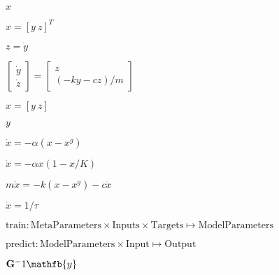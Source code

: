 \documentclass{article}
\begin{document}
$ x $
\pagebreak

$ x = [y~z]^T$
\pagebreak

$ z = \dot{y}$
\pagebreak

$ \left[ \begin{array}{l} \dot{y} \\ \dot{z} \end{array} \right] = \left[ \begin{array}{l} z \\ (-ky -cz)/m \end{array} \right] $
\pagebreak

$ x = [y~z]$
\pagebreak

$ y $
\pagebreak

$\dot{x} = -\alpha (x-x^g)$
\pagebreak

$\dot{x} = -\alpha x(1-x/K)$
\pagebreak

$ m\ddot{x} = -k(x-x^g) -c\dot{x}$
\pagebreak

$\dot{x} = 1/\tau$
\pagebreak

$ \mbox{train}: \mbox{MetaParameters} \times \mbox{Inputs} \times \mbox{Targets} \mapsto \mbox{ModelParameters} $
\pagebreak

$ \mbox{predict}: \mbox{ModelParameters} \times \mbox{Input} \mapsto \mbox{Output}$
\pagebreak

$ \mathbf{G}^-1\mathfb{y} $
\pagebreak
\end{document}
